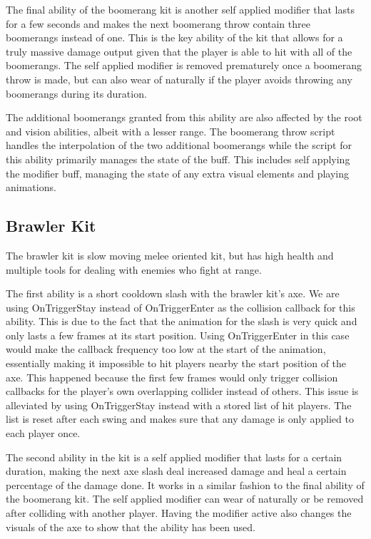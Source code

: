 The final ability of the boomerang kit is another self applied modifier that lasts for a few seconds and makes the next boomerang throw contain three boomerangs instead of one. This is the key ability of the kit that allows for a truly massive damage output given that the player is able to hit with all of the boomerangs. The self applied modifier is removed prematurely once a boomerang throw is made, but can also wear of naturally if the player avoids throwing any boomerangs during its duration. 

The additional boomerangs granted from this ability are also affected by the root and vision abilities, albeit with a lesser range. The boomerang throw script handles the interpolation of the two additional boomerangs while the script for this ability primarily manages the state of the buff. This includes self applying the modifier buff, managing the state of any extra visual elements and playing animations. 
    

\subsection{Brawler Kit}
The brawler kit is slow moving melee oriented kit, but has high health and multiple tools for dealing with enemies who fight at range. 

The first ability is a short cooldown slash with the brawler kit's axe. We are using OnTriggerStay instead of OnTriggerEnter as the collision callback for this ability. This is due to the fact that the animation for the slash is very quick and only lasts a few frames at its start position. Using OnTriggerEnter in this case would make the callback frequency too low at the start of the animation, essentially making it impossible to hit players nearby the start position of the axe. This happened because the first few frames would only trigger collision callbacks for the player's own overlapping collider instead of others. 
This issue is alleviated by using OnTriggerStay instead with a stored list of hit players. The list is reset after each swing and makes sure that any damage is only applied to each player once. 

The second ability in the kit is a self applied modifier that lasts for a certain duration, making the next axe slash deal increased damage and heal a certain percentage of the damage done. It works in a similar fashion to the final ability of the boomerang kit. The self applied modifier can wear of naturally or be removed after colliding with another player. Having the modifier active also changes the visuals of the axe to show that the ability has been used. 

